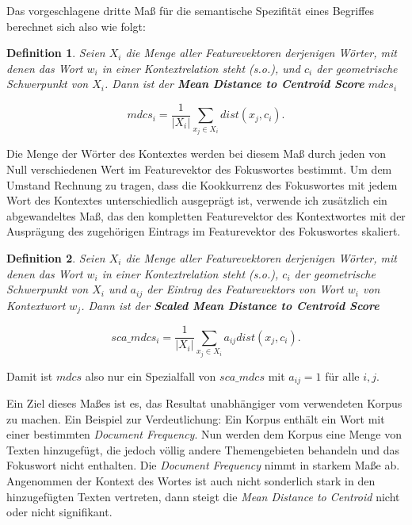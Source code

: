 \documentclass[11pt,numbers=noenddot]{scrartcl}
\newtheorem*{defi}{Definition}
\begin{document}
Das vorgeschlagene dritte Maß für die semantische Spezifität eines Begriffes berechnet sich also wie folgt:

\begin{defi}
Seien $X_i$ die Menge aller Featurevektoren derjenigen Wörter, mit denen das Wort $w_i$ in einer Kontextrelation steht (s.o.), und $c_i$ der geometrische Schwerpunkt von $X_i$. Dann ist der \textbf{Mean Distance to Centroid Score} $mdcs_i$

\begin{equation}
   mdcs_i =  \frac{1}{|X_i|} \sum_{x_j \in X_i} dist(x_j, c_i).
\end{equation}
\end{defi}

Die Menge der Wörter des Kontextes werden bei diesem Maß durch jeden von Null verschiedenen Wert im Featurevektor des Fokuswortes bestimmt. Um dem Umstand Rechnung zu tragen, dass die Kookkurrenz des Fokuswortes mit jedem Wort des Kontextes unterschiedlich ausgeprägt ist, verwende ich zusätzlich ein abgewandeltes Maß, das den kompletten Featurevektor des Kontextwortes mit der Ausprägung des zugehörigen Eintrags im Featurevektor des Fokuswortes skaliert.

\begin{defi}
Seien $X_i$ die Menge aller Featurevektoren derjenigen Wörter, mit denen das Wort $w_i$ in einer Kontextrelation steht (s.o.), $c_i$ der geometrische Schwerpunkt von $X_i$ und $a_{ij}$ der Eintrag des Featurevektors von Wort $w_i$ von Kontextwort $w_j$. Dann ist der \textbf{Scaled Mean Distance to Centroid Score}

$$
  sca\_mdcs_i =  \frac{1}{|X_i|} \sum_{x_j \in X_i}  a_{ij} dist(x_j, c_i).
$$

\end{defi}

Damit ist $mdcs$ also nur ein Spezialfall von $sca\_mdcs$ mit $a_{ij} = 1$ für alle $i,j$.

Ein Ziel dieses Maßes ist es, das Resultat unabhängiger vom verwendeten Korpus zu machen. Ein Beispiel zur Verdeutlichung: Ein Korpus enthält ein Wort mit einer bestimmten \emph{Document Frequency}. Nun werden dem Korpus eine Menge von Texten hinzugefügt, die jedoch völlig andere Themengebieten behandeln und das Fokuswort nicht enthalten. Die \emph{Document Frequency} nimmt in starkem Maße ab. Angenommen der Kontext des Wortes ist auch nicht sonderlich stark in den hinzugefügten Texten vertreten, dann steigt die \emph{Mean Distance to Centroid} nicht oder nicht signifikant.
\end{document}

